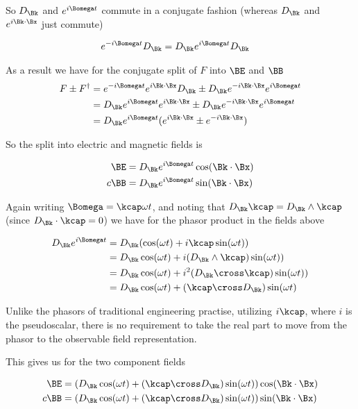 \documentclass[]{eliblog}
\begin{document}
So $D_\Bk$ and $e^{i\Bomega t}$ commute in a conjugate fashion (whereas $D_\Bk$ and $e^{i\Bk \cdot \Bx}$ just commute)

\begin{align*}
e^{-i\Bomega t} D_\Bk &= D_\Bk e^{i\Bomega t} D_\Bk 
\end{align*}

As a result we have for the conjugate split of $F$ into $\BE$ and $\BB$
\begin{align*}
F \pm F^\dagger 
&= e^{-i\Bomega t} e^{i \Bk \cdot \Bx} D_\Bk \pm D_\Bk e^{-i \Bk \cdot \Bx} e^{i\Bomega t} \\
&= D_\Bk e^{i\Bomega t} e^{i \Bk \cdot \Bx} \pm D_\Bk e^{-i \Bk \cdot \Bx} e^{i\Bomega t} \\
&= D_\Bk e^{i\Bomega t} (e^{i \Bk \cdot \Bx} \pm e^{-i \Bk \cdot \Bx} ) \\
\end{align*}

So the split into electric and magnetic fields is

\begin{align*}
\BE &= D_\Bk e^{i\Bomega t} \cos(\Bk \cdot \Bx) \\
c\BB &= D_\Bk e^{i\Bomega t} \sin(\Bk \cdot \Bx)
\end{align*}

Again writing $\Bomega = \kcap \omega t$, and noting that $D_\Bk \kcap = D_\Bk \wedge \kcap$ (since $D_\Bk \cdot \kcap = 0$) we have for the phasor product in the fields above

\begin{align*}
D_\Bk e^{i\Bomega t} 
&=
D_\Bk (\cos(\omega t) + i\kcap \sin(\omega t)) \\
&=
D_\Bk \cos(\omega t) + i (D_\Bk \wedge \kcap) \sin(\omega t)) \\
&=
D_\Bk \cos(\omega t) + i^2 (D_\Bk \cross \kcap) \sin(\omega t)) \\
&=
D_\Bk \cos(\omega t) + (\kcap \cross D_\Bk) \sin(\omega t) \\
\end{align*}

Unlike the phasors of traditional engineering practise, utilizing $i\kcap$, where $i$ is the pseudoscalar, there
is no requirement to take the real part to move from the phasor to the observable field representation.  

This gives us for the two component fields

\begin{align}\label{eqn:splitFields}
\BE &= \left( D_\Bk \cos(\omega t) + (\kcap \cross D_\Bk) \sin(\omega t) \right) \cos(\Bk \cdot \Bx) \\
c \BB &= \left( D_\Bk \cos(\omega t) + (\kcap \cross D_\Bk) \sin(\omega t) \right) \sin(\Bk \cdot \Bx)
\end{align}
\end{document}
